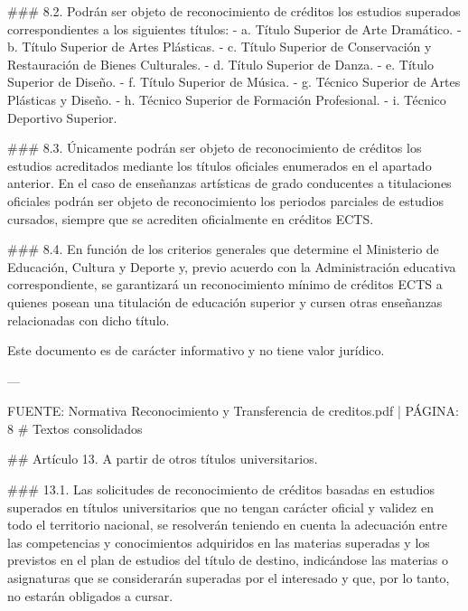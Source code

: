 \documentclass{article}
\begin{document}
\begin{itemize}
\begin{itemize}
\begin{scriptsize}
                  \#\#\# 8.2.
                  Podrán ser objeto de reconocimiento de créditos los estudios superados correspondientes a los siguientes títulos:
                  - a. Título Superior de Arte Dramático.
                  - b. Título Superior de Artes Plásticas.
                  - c. Título Superior de Conservación y Restauración de Bienes Culturales.
                  - d. Título Superior de Danza.
                  - e. Título Superior de Diseño.
                  - f. Título Superior de Música.
                  - g. Técnico Superior de Artes Plásticas y Diseño.
                  - h. Técnico Superior de Formación Profesional.
                  - i. Técnico Deportivo Superior.

                  \#\#\# 8.3.
                  Únicamente podrán ser objeto de reconocimiento de créditos los estudios acreditados mediante los títulos oficiales enumerados en el apartado anterior. En el caso de enseñanzas artísticas de grado conducentes a titulaciones oficiales podrán ser objeto de reconocimiento los periodos parciales de estudios cursados, siempre que se acrediten oficialmente en créditos ECTS.

                  \#\#\# 8.4.
                  En función de los criterios generales que determine el Ministerio de Educación, Cultura y Deporte y, previo acuerdo con la Administración educativa correspondiente, se garantizará un reconocimiento mínimo de créditos ECTS a quienes posean una titulación de educación superior y cursen otras enseñanzas relacionadas con dicho título.

                  Este documento es de carácter informativo y no tiene valor jurídico.

                  ---

                  FUENTE: Normativa Reconocimiento y Transferencia de creditos.pdf | PÁGINA: 8
                  \# Textos consolidados

                  \#\# Artículo 13. A partir de otros títulos universitarios.

                  \#\#\# 13.1.
                  Las solicitudes de reconocimiento de créditos basadas en estudios superados en títulos universitarios que no tengan carácter oficial y validez en todo el territorio nacional, se resolverán teniendo en cuenta la adecuación entre las competencias y conocimientos adquiridos en las materias superadas y los previstos en el plan de estudios del título de destino, indicándose las materias o asignaturas que se considerarán superadas por el interesado y que, por lo tanto, no estarán obligados a cursar.


\end{scriptsize}
\end{itemize}
\end{itemize}
\end{document}
